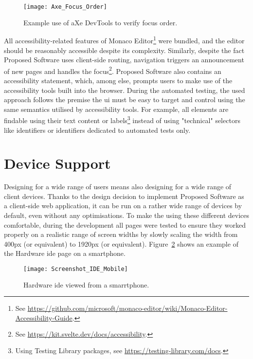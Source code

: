 \begin{figure}[H]
    \centering
    \texttt{[image: Axe\_Focus\_Order]}
    \caption{Example use of aXe DevTools to verify focus order.}
    \label{fig:design-axe-focus}
\end{figure}

All accessibility-related features of Monaco Editor\footnote{See \url{https://github.com/microsoft/monaco-editor/wiki/Monaco-Editor-Accessibility-Guide}.} were bundled, and the editor should be reasonably accessible despite its complexity.
Similarly, despite the fact Proposed Software uses client-side routing, navigation triggers an announcement of new pages and handles the focus\footnote{See \url{https://kit.svelte.dev/docs/accessibility}.}.
Proposed Software also contains an accessibility statement, which, among else, prompts users to make use of the accessibility tools built into the browser.
During the automated testing, the used approach follows the premise the \gls{ui} must be easy to target and control using the same semantics utilised by accessibility tools.
For example, all elements are findable using their text content or labels\footnote{Using Testing Library packages, see \url{https://testing-library.com/docs}.} instead of using "technical" selectors like identifiers or identifiers dedicated to automated tests only.

\section{Device Support}

Designing for a wide range of users means also designing for a wide range of client devices.
Thanks to the design decision to implement Proposed Software as a client-side web application, it can be run on a rather wide range of devices by default, even without any optimisations.
To make the using these different devices comfortable, during the development all pages were tested to ensure they worked properly on a realistic range of screen widths by slowly scaling the width from 400px (or equivalent) to 1920px (or equivalent).
Figure~\ref{fig:design-screenshot-ide-mobile} shows an example of the Hardware \gls{ide} page on a smartphone.

\begin{figure}[H]
    \centering
    \texttt{[image: Screenshot\_IDE\_Mobile]}
    \caption{Hardware \gls{ide} viewed from a smarrtphone.}
    \label{fig:design-screenshot-ide-mobile}
\end{figure}

